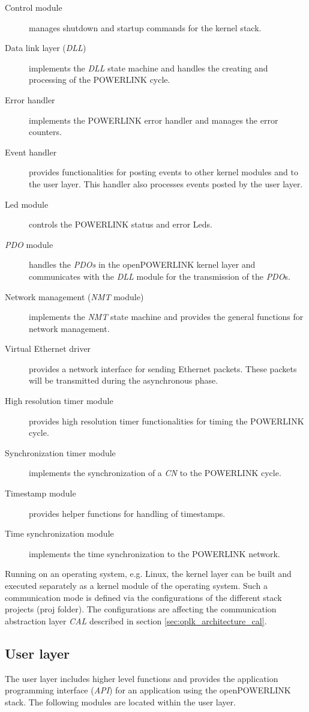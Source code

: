 \begin{description}
    \item[Control module] manages shutdown and startup commands for the kernel stack.
    \item[Data link layer (\emph{DLL})] implements the \emph{DLL} state machine and handles the creating and processing of the POWERLINK cycle.
    \item[Error handler] implements the POWERLINK error handler and manages the error counters.
    \item[Event handler] provides functionalities for posting events to other kernel modules and to the user layer.
    This handler also processes events posted by the user layer.
    \item[Led module] controls the POWERLINK status and error Leds.
    \item[\emph{PDO} module] handles the \emph{PDOs} in the openPOWERLINK kernel layer and communicates with the \emph{DLL} module for the transmission of the \emph{PDO}s.
    \item[Network management (\emph{NMT} module)] implements the \emph{NMT} state machine and provides the general functions for network management.
    \item[Virtual Ethernet driver] provides a network interface for sending Ethernet packets.
    These packets will be transmitted during the asynchronous phase.
    \item[High resolution timer module] provides high resolution timer functionalities for timing the POWERLINK cycle.
    \item[Synchronization timer module] implements the synchronization of a \emph{CN} to the POWERLINK cycle.
    \item[Timestamp module] provides helper functions for handling of timestamps.
    \item[Time synchronization module] implements the time synchronization to the POWERLINK network.
\end{description}

Running on an operating system, e.g. Linux, the kernel layer can be built and executed separately as a kernel module of the operating system.
Such a communication mode is defined via the configurations of the different stack projects (proj folder).
The configurations are affecting the communication abstraction layer \emph{CAL} described in section \ref{sec:oplk_architecture_cal}.

\subsection{User layer}
\label{sec:oplk_architecture_user}
\begin{sloppypar}
The user layer includes higher level functions and provides the application programming interface (\emph{API}) for an application using the openPOWERLINK stack.
The following modules are located within the user layer. \cite[openPOWERLINK User Layer]{openpowerlink_doc}
\end{sloppypar}

